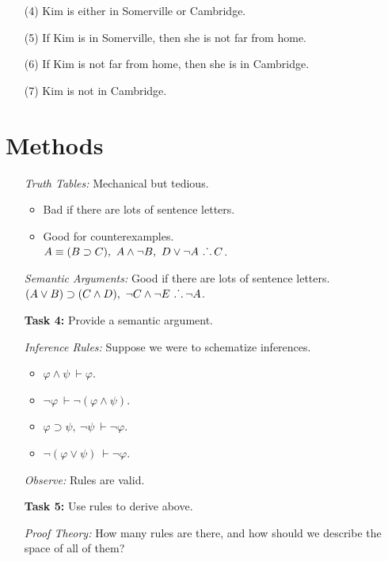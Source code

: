 \documentclass[a4paper, 11pt]{article} %
\def\therefore{\ensuremath{\ldotp\dot{}\,\ldotp}}
\begin{document}
\begin{enumerate}
  \item[(4)] Kim is either in Somerville or Cambridge.
  \item[(5)] If Kim is in Somerville, then she is not far from home.
  \item[(6)] If Kim is not far from home, then she is in Cambridge.
  \item[(7)] Kim is not in Cambridge.
\end{enumerate}






\section*{Methods}

\begin{enumerate}[leftmargin=1.2in,labelsep=.15in] %
  \item[\it Truth Tables:] Mechanical but tedious.
  \begin{itemize}
    \item Bad if there are lots of sentence letters.
    \item Good for counterexamples.\\
      $A \equiv (B \supset C),\ A \wedge \neg B,\ D \vee \neg A\ \therefore C$.
  \end{itemize}
  \item[\it Semantic Arguments:] Good if there are lots of sentence letters.\\
        $(A \vee B) \supset (C \wedge D),\ \neg C \wedge \neg E\ \therefore \neg A$.
  \item[\bf Task 4:] Provide a semantic argument.
  \item[\it Inference Rules:] Suppose we were to schematize inferences.
    \begin{itemize}
      \item $\varphi \wedge \psi\ \vdash \varphi$.
      \item $\neg \varphi\ \vdash \neg(\varphi \wedge \psi)$.
      \item $\varphi \supset \psi,\ \neg \psi\ \vdash \neg \varphi$.
      \item $\neg(\varphi \vee \psi)\ \vdash \neg \varphi$.
    \end{itemize}
  \item[\it Observe:] Rules are valid.
  \item[\bf Task 5:] Use rules to derive above.
  \item[\it Proof Theory:] How many rules are there, and how should we describe the space of all of them?
\end{enumerate}
\end{document}
